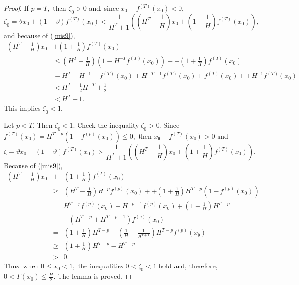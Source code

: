 \documentclass[12pt,a4paper]{amsart}
\begin{document}
\begin{proof}
%
If $p=T,$ then $\zeta_0  > 0$ and, since $x_0 - f^{(T)}(x_0) < 0,$ 
$$
\zeta_0=\vartheta x_0 + (1-\vartheta)f^{(T)}(x_0) < 
\frac{1}{H^T + 1} \left ( \left(H^T - \frac{1}{H}\right)x_0 + \left(1 + \frac{1}{H}\right) f^{(T)}(x_0) \right),
$$
and because of (\ref{mis9}), 
\begin{align*}
\left(H^T - \frac{1}{H}\right)x_0 &+ \left(1 + \frac{1}{H}\right) f^{(T)}(x_0) \\
&\leq \left(H^T - \frac{1}{H}\right)
\left(1 - H^{-T} f^{(T)}(x_0)\right) + 
+ \left(1 + \frac{1}{H}\right) f^{(T)}(x_0) \\
&= H^T - H^{-1} -f^{(T)}(x_0) + H^{-T-1}f^{(T)}(x_0) + f^{(T)}(x_0) +
+ H^{-1}f^{(T)}(x_0) \\
&< H^T + \frac12 H^{-T} +\frac12 \\
&< H^T +1.
\end{align*}
This implies $\zeta_0 < 1.$

Let $p<T.$ Then $\zeta_0 < 1.$ Check the inequality $\zeta_0 > 0.$ Since 
$f^{(T)}(x_0) = H^{T-p} \left(1 - f^{(p)}(x_0)\right) \leq 0,$ then $x_0 - f^{(T)}(x_0) > 0$ and
 $$
\zeta=\vartheta x_0 + (1-\vartheta)f^{(T)}(x_0) > 
\frac{1}{H^T + 1} \left ( \left(H^T - \frac{1}{H}\right)x_0 + \left(1 + \frac{1}{H}\right) f^{(T)}(x_0) \right).
$$
Because of (\ref{mis9}), 
\begin{eqnarray*}
\left(H^T - \frac{1}{H}\right)x_0 &+& \left(1 + \frac{1}{H}\right) f^{(T)}(x_0)  \\
&\geq& 
\left(H^T - \frac{1}{H}\right) H^{-p} f^{(p)}(x_0) +
+ \left(1 + \frac{1}{H}\right) H^{T-p} \left(1- f^{(p)}(x_0)\right) \\
&=& H^{T-p} f^{(p)}(x_0) - H^{-p-1} f^{(p)}(x_0)
+ \left(1 + \frac{1}{H}\right) H^{T-p} \\
&& - \left(H^{T-p}+H^{T-p-1}\right)f^{(p)}(x_0) \\
&=& \left(1 + \frac{1}{H}\right) H^{T-p}  
- \left({ \frac{1}{H} + \frac{1}{H^{T+1}}}\right)H^{T-p}f^{(p)}(x_0) \\
&\geq& \left(1 + \frac{1}{H}\right) H^{T-p} - H^{T-p} \\
&>& 0.
\end{eqnarray*}
Thus, when $0 \leq x_0 < 1,$ the inequalities $0<\zeta_0 <1$ hold and, therefore, $0 < F(x_0) \leq \frac{H}{2}.$ 
The lemma is proved. 
\end{proof}
\end{document}
